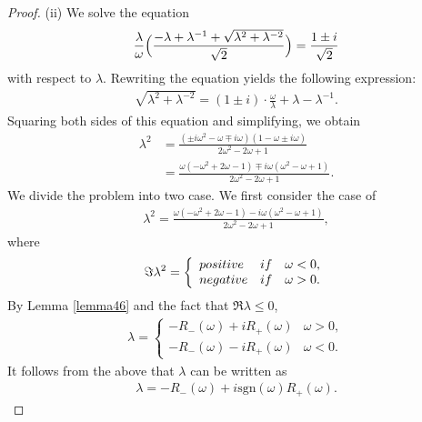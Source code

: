 \documentclass[10pt,a4paper]{amsart}
\begin{document}
\begin{proof}
($\mathrm{ii}$) We solve the equation
\begin{eqnarray*}
\frac{\lambda}{\omega}\Bigl(\frac{-\lambda +\lambda^{-1}+\sqrt{\lambda^2 +\lambda^{-2}}}{\sqrt{2}}\Bigr)=\frac{1\pm i}{\sqrt{2}}
\end{eqnarray*}
with respect to $\lambda$.
Rewriting the equation yields the following expression:
\begin{align}
    \label{416}
    \sqrt{\lambda^2+\lambda^{-2}}=(1\pm i)\cdot \frac{\omega}{\lambda}+\lambda-\lambda^{-1}.
\end{align}
Squaring both sides of this equation and simplifying, we obtain
\begin{align}
\lambda^2 &= \frac{(\pm i\omega^2 - \omega \mp i\omega)(1-\omega \pm i\omega )}{2\omega^2 -2\omega +1} \nonumber \\
&= \frac{\omega (-\omega ^2 +2\omega -1) \mp i\omega (\omega ^2 -\omega +1)}{2\omega ^2 -2\omega +1}. \nonumber
 \end{align}
We divide the problem into two case. We first consider the case of 
\begin{align*}
\lambda ^2= \frac{\omega (-\omega ^2 +2\omega -1) - i\omega (\omega ^2 -\omega +1)}{2\omega ^2 -2\omega +1},
 \end{align*}
where
\begin{eqnarray*}
\Im \lambda^2 = \left\{
\begin{array}{ll}
{\rm positive} &  {\rm if} \quad  \omega <0,\\
{\rm negative} & {\rm if} \quad \omega >0.
\end{array}
\right. 
\end{eqnarray*}
By Lemma \ref{lemma46} and the fact that $\Re \lambda \leq 0$,
\begin{eqnarray*}
\lambda = \left\{
\begin{array}{ll}
-R_{-}(\omega)+iR_{+}(\omega) &   \omega >0,\\
-R_{-}(\omega)-iR_{+}(\omega) &  \omega <0.
\end{array}
\right.
\end{eqnarray*}
It follows from the above that $\lambda$ can be written as
\begin{align*}
    \lambda = -R_{-}(\omega)+i\mathrm{sgn}(\omega)R_{+}(\omega).
\end{align*}


\end{proof}
\end{document}
